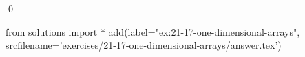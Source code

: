 
\begin{ex}
  \label{ex:21-17-one-dimensional-arrays}
  
  \qed
\end{ex}
\begin{python0}
from solutions import *
add(label="ex:21-17-one-dimensional-arrays",
    srcfilename='exercises/21-17-one-dimensional-arrays/answer.tex')
\end{python0}
